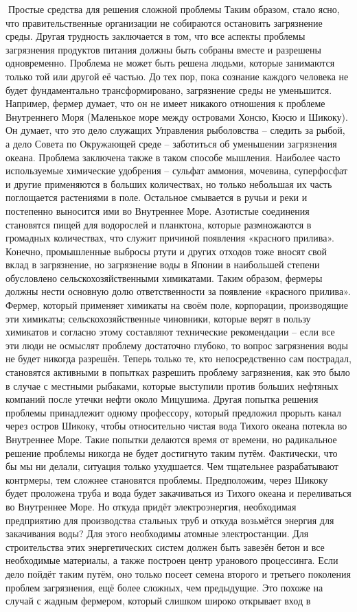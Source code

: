 \documentclass[a4paper]{book}
\begin{document}
Простые средства для решения сложной проблемы
Таким образом, стало ясно, что правительственные организации не собираются
остановить загрязнение среды. Другая трудность заключается в том, что все аспекты
проблемы загрязнения продуктов питания должны быть собраны вместе и разрешены
одновременно. Проблема не может быть решена людьми, которые занимаются только той
или другой её частью. До тех пор, пока сознание каждого человека не будет фундаментально
трансформировано, загрязнение среды не уменьшится.
Например, фермер думает, что он не имеет никакого отношения к проблеме
Внутреннего Моря (Маленькое море между островами Хонсю, Кюсю и Шикоку). Он думает,
что это дело служащих Управления рыболовства – следить за рыбой, а дело Совета по
Окружающей среде – заботиться об уменьшении загрязнения океана. Проблема заключена
также в таком способе мышления.
Наиболее часто используемые химические удобрения – сульфат аммония, мочевина,
суперфосфат и другие применяются в больших количествах, но только небольшая их часть
поглощается растениями в поле. Остальное смывается в ручьи и реки и постепенно
выносится ими во Внутреннее Море. Азотистые соединения становятся пищей для
водорослей и планктона, которые размножаются в громадных количествах, что служит
причиной появления «красного прилива». Конечно, промышленные выбросы ртути и других
отходов тоже вносят свой вклад в загрязнение, но загрязнение воды в Японии в наибольшей
степени обусловлено сельскохозяйственными химикатами.
Таким образом, фермеры должны нести основную долю ответственности за появление
«красного прилива». Фермер, который применяет химикаты на своём поле, корпорации,
производящие эти химикаты; сельскохозяйственные чиновники, которые верят в пользу
химикатов и согласно этому составляют технические рекомендации – если все эти люди не
осмыслят проблему достаточно глубоко, то вопрос загрязнения воды не будет никогда
разрешён.
Теперь только те, кто непосредственно сам пострадал, становятся активными в
попытках разрешить проблему загрязнения, как это было в случае с местными рыбаками,
которые выступили против больших нефтяных компаний после утечки нефти около
Мицушима. Другая попытка решения проблемы принадлежит одному профессору, который
предложил прорыть канал через остров Шикоку, чтобы относительно чистая вода Тихого
океана потекла во Внутреннее Море. Такие попытки делаются время от времени, но
радикальное решение проблемы никогда не будет достигнуто таким путём.
Фактически, что бы мы ни делали, ситуация только ухудшается. Чем тщательнее
разрабатывают контрмеры, тем сложнее становятся проблемы. Предположим, через Шикоку
будет проложена труба и вода будет закачиваться из Тихого океана и переливаться во
Внутреннее Море. Но откуда придёт электроэнергия, необходимая предприятию для
производства стальных труб и откуда возьмётся энергия для закачивания воды? Для этого
необходимы атомные электростанции. Для строительства этих энергетических систем
должен быть завезён бетон и все необходимые материалы, а также построен центр уранового
процессинга. Если дело пойдёт таким путём, оно только посеет семена второго и третьего
поколения проблем загрязнения, ещё более сложных, чем предыдущие.
Это похоже на случай с жадным фермером, который слишком широко открывает вход в
\end{document}
